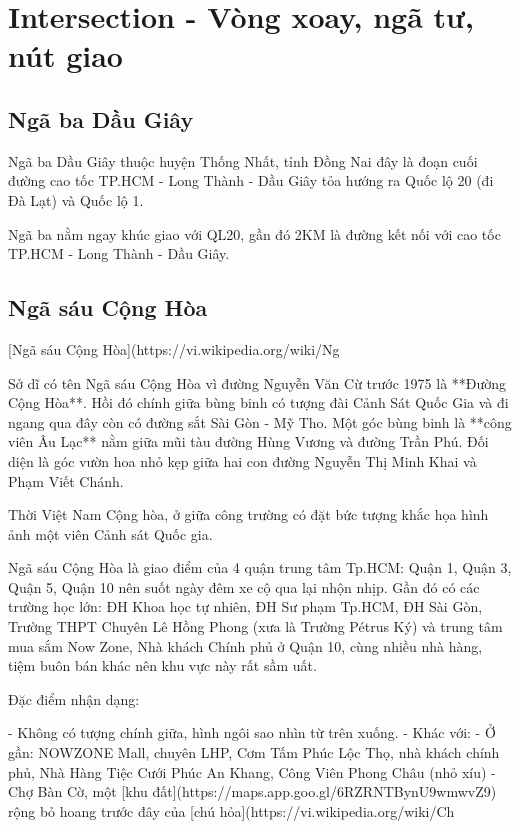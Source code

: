 \chapter{Intersection - Vòng xoay, ngã tư, nút giao}

\section{Ngã ba Dầu Giây}

Ngã ba Dầu Giây thuộc huyện Thống Nhất, tỉnh Đồng Nai đây là đoạn cuối đường cao tốc TP.HCM - Long Thành - Dầu Giây tỏa hướng ra Quốc lộ 20 (đi Đà Lạt) và Quốc lộ 1.

Ngã ba nằm ngay khúc giao với QL20, gần đó 2KM là đường kết nối với cao tốc TP.HCM - Long Thành - Dầu Giây.

\section{Ngã sáu Cộng Hòa}

[Ngã sáu Cộng Hòa](https://vi.wikipedia.org/wiki/Ng%

Sở dĩ có tên Ngã sáu Cộng Hòa vì đường Nguyễn Văn Cừ trước 1975 là **Đường Cộng Hòa**. Hồi đó chính giữa bùng binh có tượng đài Cảnh Sát Quốc Gia và đi ngang qua đây còn có đường sắt Sài Gòn - Mỹ Tho. Một góc bùng binh là **công viên Âu Lạc** nằm giữa mũi tàu đường Hùng Vương và đường Trần Phú. Đối diện là góc vườn hoa nhỏ kẹp giữa hai con đường Nguyễn Thị Minh Khai và Phạm Viết Chánh.

Thời Việt Nam Cộng hòa, ở giữa công trường có đặt bức tượng khắc họa hình ảnh một viên Cảnh sát Quốc gia.

Ngã sáu Cộng Hòa là giao điểm của 4 quận trung tâm Tp.HCM: Quận 1, Quận 3, Quận 5, Quận 10 nên suốt ngày đêm xe cộ qua lại nhộn nhịp. Gần đó có các trường học lớn: ĐH Khoa học tự nhiên, ĐH Sư phạm Tp.HCM, ĐH Sài Gòn, Trường THPT Chuyên Lê Hồng Phong (xưa là Trường Pétrus Ký) và trung tâm mua sắm Now Zone, Nhà khách Chính phủ ở Quận 10, cùng nhiều nhà hàng, tiệm buôn bán khác nên khu vực này rất sầm uất.

Đặc điểm nhận dạng:

- Không có tượng chính giữa, hình ngôi sao nhìn từ trên xuống.
- Khác với:
- Ở gần: NOWZONE Mall, chuyên LHP, Cơm Tấm Phúc Lộc Thọ, nhà khách chính phủ, Nhà Hàng Tiệc Cưới Phúc An Khang, Công Viên Phong Châu (nhỏ xíu)
- Chợ Bàn Cờ, một [khu đất](https://maps.app.goo.gl/6RZRNTBynU9wmwvZ9) rộng bỏ hoang trước đây của [chú hỏa](https://vi.wikipedia.org/wiki/Ch%

